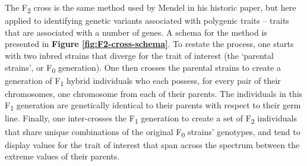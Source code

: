 \documentclass[
]{book}
\begin{document}
The F\textsubscript{2} cross is the same method used by Mendel in his historic paper, but here applied to identifying genetic variants associated with polygenic traits -- traits that are associated with a number of genes. A schema for the method is presented in \textbf{Figure \ref{fig:F2-cross-schema}}. To restate the process, one starts with two inbred strains that diverge for the trait of interest (the `parental strains', or F\textsubscript{0} generation). One then crosses the parental strains to create a generation of F\textsubscript{1} hybrid individuals who each possess, for every pair of their chromosomes, one chromosome from each of their parents. The individuals in this F\textsubscript{1} generation are genetically identical to their parents with respect to their germ line. Finally, one inter-crosses the F\textsubscript{1} generation to create a set of F\textsubscript{2} individuals that share unique combinations of the original F\textsubscript{0} strains' genotypes, and tend to display values for the trait of interest that span across the spectrum between the extreme values of their parents.
\end{document}
